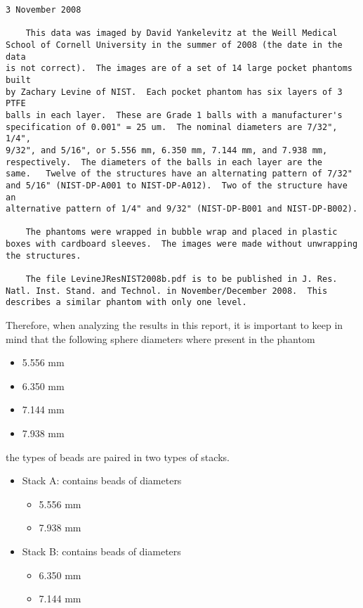 \documentclass{InsightArticle}
\begin{document}
\begin{verbatim}
3 November 2008

	This data was imaged by David Yankelevitz at the Weill Medical
School of Cornell University in the summer of 2008 (the date in the data
is not correct).  The images are of a set of 14 large pocket phantoms built
by Zachary Levine of NIST.  Each pocket phantom has six layers of 3 PTFE
balls in each layer.  These are Grade 1 balls with a manufacturer's
specification of 0.001" = 25 um.  The nominal diameters are 7/32", 1/4",
9/32", and 5/16", or 5.556 mm, 6.350 mm, 7.144 mm, and 7.938 mm,
respectively.  The diameters of the balls in each layer are the
same.   Twelve of the structures have an alternating pattern of 7/32"
and 5/16" (NIST-DP-A001 to NIST-DP-A012).  Two of the structure have an
alternative pattern of 1/4" and 9/32" (NIST-DP-B001 and NIST-DP-B002).

	The phantoms were wrapped in bubble wrap and placed in plastic
boxes with cardboard sleeves.  The images were made without unwrapping
the structures.

	The file LevineJResNIST2008b.pdf is to be published in J. Res.
Natl. Inst. Stand. and Technol. in November/December 2008.  This
describes a similar phantom with only one level.
\end{verbatim}

Therefore, when analyzing the results in this report, it is important to keep
in mind that the following sphere diameters where present in the phantom

\begin{itemize}
\item 5.556 mm
\item 6.350 mm
\item 7.144 mm
\item 7.938 mm
\end{itemize}

the types of beads are paired in two types of stacks.

\begin{itemize}
\item Stack A: contains beads of diameters
\begin{itemize}
\item 5.556 mm
\item 7.938 mm
\end{itemize}
\item Stack B: contains beads of diameters
\begin{itemize}
\item 6.350 mm
\item 7.144 mm
\end{itemize}
\end{itemize}
\end{document}

